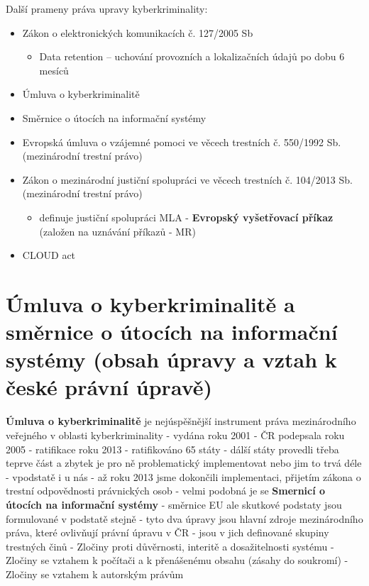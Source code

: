 Další prameny práva upravy kyberkriminality:
\begin{itemize}
    \item Zákon o elektronických komunikacích č. 127/2005 Sb
        \begin{itemize}
            \item Data retention -- uchování provozních a lokalizačních údajů po dobu 6 mesíců
        \end{itemize}
    \item Úmluva o kyberkriminalitě
    \item Směrnice o útocích na informační systémy
    \item Evropská úmluva o vzájemné pomoci ve věcech trestních č.
    550/1992 Sb. (mezinárodní trestní právo)
    \item Zákon o mezinárodní justiční spolupráci ve věcech trestních
    č. 104/2013 Sb. (mezinárodní trestní právo)
    \begin{itemize}
            \item definuje justiční spolupráci MLA - \textbf{Evropský vyšetřovací příkaz} (založen na uznávání příkazů - MR)
        \end{itemize}
    \item CLOUD act
\end{itemize}


\newpage
\section{Úmluva o kyberkriminalitě a směrnice o útocích na informační systémy (obsah úpravy a vztah k české právní úpravě)}

\textbf{Úmluva o kyberkriminalitě} je nejúspěšnější instrument práva mezinárodního veřejného v oblasti kyberkriminality - vydána roku 2001 - ČR podepsala roku 2005 - ratifikace roku 2013 - ratifikováno 65 státy - dálší
státy provedli třeba teprve část a zbytek je pro ně problematický implementovat nebo jim to trvá
déle - vpodstatě i u nás - až roku 2013 jsme dokončili implementaci, přijetím zákona o trestní
odpovědnosti právnických osob - velmi podobná je se \textbf{Smernicí o útocích na informační
systémy} - směrnice EU ale skutkové podstaty jsou formulované v podstatě stejně - tyto
dva úpravy jsou hlavní zdroje mezinárodního práva, které ovlivňují právní úpravu v ČR - jsou v jich
definované skupiny trestných činů - Zločiny proti důvěrnosti, interitě a dosažitelnosti systému -
Zločiny se vztahem k počítači a k přenášenému obsahu (zásahy do soukromí) - Zločiny se vztahem
k autorským právům

